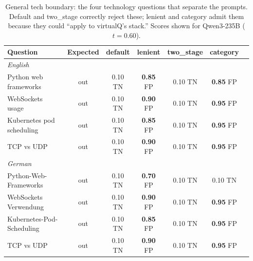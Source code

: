 \begin{table}[ht]
\centering
\caption{General tech boundary: the four technology questions that separate the prompts. Default and two\_stage correctly reject these; lenient and category admit them because they could ``apply to virtualQ's stack.'' Scores shown for Qwen3-235B ($t{=}0.60$).}
\label{tab:dj-general-tech-boundary}
\begin{tabular}{lcccccc}
\toprule
Question & Expected & default & lenient & two\_stage & category \\
\midrule
\multicolumn{6}{l}{\textit{English}} \\
\midrule
Python web frameworks          & out & 0.10 \scriptsize{TN} & \textbf{0.85} \scriptsize{FP} & 0.10 \scriptsize{TN} & \textbf{0.85} \scriptsize{FP} \\
WebSockets usage               & out & 0.10 \scriptsize{TN} & \textbf{0.90} \scriptsize{FP} & 0.10 \scriptsize{TN} & \textbf{0.95} \scriptsize{FP} \\
Kubernetes pod scheduling      & out & 0.10 \scriptsize{TN} & \textbf{0.85} \scriptsize{FP} & 0.10 \scriptsize{TN} & \textbf{0.95} \scriptsize{FP} \\
TCP vs UDP                     & out & 0.10 \scriptsize{TN} & \textbf{0.90} \scriptsize{FP} & 0.10 \scriptsize{TN} & \textbf{0.95} \scriptsize{FP} \\
\midrule
\multicolumn{6}{l}{\textit{German}} \\
\midrule
Python-Web-Frameworks          & out & 0.10 \scriptsize{TN} & \textbf{0.70} \scriptsize{FP} & 0.10 \scriptsize{TN} & 0.10 \scriptsize{TN} \\
WebSockets Verwendung          & out & 0.10 \scriptsize{TN} & \textbf{0.90} \scriptsize{FP} & 0.10 \scriptsize{TN} & \textbf{0.95} \scriptsize{FP} \\
Kubernetes-Pod-Scheduling      & out & 0.10 \scriptsize{TN} & \textbf{0.85} \scriptsize{FP} & 0.10 \scriptsize{TN} & \textbf{0.95} \scriptsize{FP} \\
TCP vs UDP                     & out & 0.10 \scriptsize{TN} & \textbf{0.90} \scriptsize{FP} & 0.10 \scriptsize{TN} & \textbf{0.95} \scriptsize{FP} \\
\bottomrule
\end{tabular}
\end{table}



